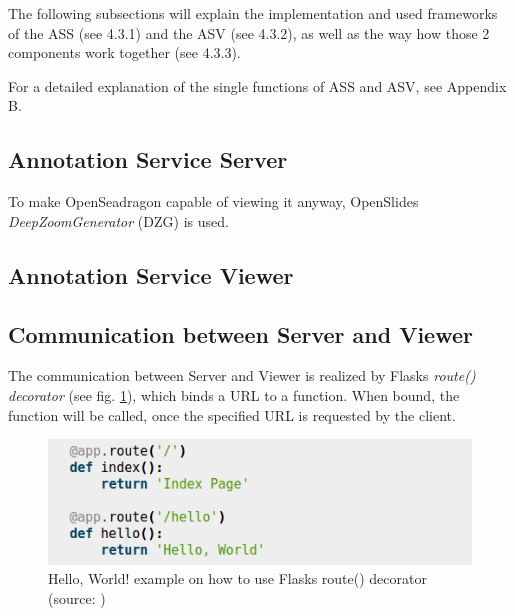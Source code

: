 The following subsections will explain the implementation and used frameworks of the ASS (see 4.3.1) and the ASV (see 4.3.2), as well as the way how those 2 components work together (see 4.3.3).

For a detailed explanation of the single functions of ASS and ASV, see Appendix B.

\subsection{Annotation Service Server}
To make OpenSeadragon capable of viewing it anyway, OpenSlides \emph{DeepZoomGenerator} (DZG) is used.

\subsection{Annotation Service Viewer}

\subsection{Communication between Server and Viewer}

The communication between Server and Viewer is realized by Flasks \emph{route() decorator} (see fig. \ref{fig4_routeDecorator}), which binds a URL to a function\cite{web:flask}. When bound, the function will be called, once the specified URL is requested by the client.

\begin{figure}[H]
	\begin{center}
		\includegraphics[scale=0.5]{img/route.png}
		\caption{Hello, World! example on how to use Flasks route() decorator (source: \cite{web:flask})}
		\label{fig4_routeDecorator}
	\end{center}
\end{figure}

